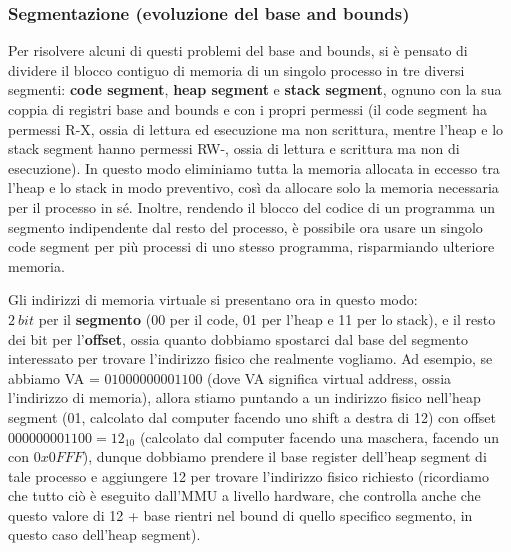 \documentclass[11pt, a4paper, titlepage, oneside]{scrbook}
\begin{document}
\subsubsection*{Segmentazione (evoluzione del base and bounds)}

Per risolvere alcuni di questi problemi del base and bounds, si è pensato di dividere il blocco contiguo di memoria di un singolo processo in tre diversi segmenti: \textbf{code segment}, \textbf{heap segment} e \textbf{stack segment}, ognuno con la sua coppia di registri base and bounds e con i propri permessi (il code segment ha permessi R-X, ossia di lettura ed esecuzione ma non scrittura, mentre l'heap e lo stack segment hanno permessi RW-, ossia di lettura e scrittura ma non di esecuzione). In questo modo eliminiamo tutta la memoria allocata in eccesso tra l'heap e lo stack in modo preventivo, così da allocare solo la memoria necessaria per il processo in sé. Inoltre, rendendo il blocco del codice di un programma un segmento indipendente dal resto del processo, è possibile ora usare un singolo code segment per più processi di uno stesso programma, risparmiando ulteriore memoria.

Gli indirizzi di memoria virtuale si presentano ora in questo modo:\\
$\SI{2}{bit}$ per il \textbf{segmento} (00 per il code, 01 per l'heap e 11 per lo stack), e il resto dei bit per l'\textbf{offset}, ossia quanto dobbiamo spostarci dal base del segmento interessato per trovare l'indirizzo fisico che realmente vogliamo. Ad esempio, se abbiamo VA = $01000000001100$ (dove VA significa virtual address, ossia l'indirizzo di memoria), allora stiamo puntando a un indirizzo fisico nell'heap segment (01, calcolato dal computer facendo uno shift a destra di 12) con offset $000000001100 = 12_{10}$ (calcolato dal computer facendo una maschera, facendo un  con $0x0FFF$), dunque dobbiamo prendere il base register dell'heap segment di tale processo e aggiungere 12 per trovare l'indirizzo fisico richiesto (ricordiamo che tutto ciò è eseguito dall'MMU a livello hardware, che controlla anche che questo valore di 12 + base rientri nel bound di quello specifico segmento, in questo caso dell'heap segment). 
\end{document}

